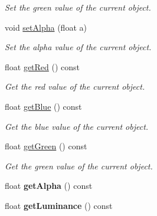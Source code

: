 \begin{DoxyCompactItemize}
\begin{DoxyCompactList}\small\item\em Set the green value of the current object. \end{DoxyCompactList}\item 
\hypertarget{classColorData_a547fb7bd1616e8657a825cb9a34c43c1}{void \hyperlink{classColorData_a547fb7bd1616e8657a825cb9a34c43c1}{set\-Alpha} (float a)}\label{classColorData_a547fb7bd1616e8657a825cb9a34c43c1}

\begin{DoxyCompactList}\small\item\em Set the alpha value of the current object. \end{DoxyCompactList}\item 
\hypertarget{classColorData_ab7066467c08dfad868fc4b1add70c2f2}{float \hyperlink{classColorData_ab7066467c08dfad868fc4b1add70c2f2}{get\-Red} () const }\label{classColorData_ab7066467c08dfad868fc4b1add70c2f2}

\begin{DoxyCompactList}\small\item\em Get the red value of the current object. \end{DoxyCompactList}\item 
\hypertarget{classColorData_ad9c600256c8abefdd76209fc1f68fcb5}{float \hyperlink{classColorData_ad9c600256c8abefdd76209fc1f68fcb5}{get\-Blue} () const }\label{classColorData_ad9c600256c8abefdd76209fc1f68fcb5}

\begin{DoxyCompactList}\small\item\em Get the blue value of the current object. \end{DoxyCompactList}\item 
\hypertarget{classColorData_a7e2e03b8e1e3270f33c4e4a69c00dbd6}{float \hyperlink{classColorData_a7e2e03b8e1e3270f33c4e4a69c00dbd6}{get\-Green} () const }\label{classColorData_a7e2e03b8e1e3270f33c4e4a69c00dbd6}

\begin{DoxyCompactList}\small\item\em Get the green value of the current object. \end{DoxyCompactList}\item 
\hypertarget{classColorData_a198c4490b4f1c512d2bc174418dc892a}{float {\bfseries get\-Alpha} () const }\label{classColorData_a198c4490b4f1c512d2bc174418dc892a}

\item 
\hypertarget{classColorData_ae6a0100e4e5fe7bbd00fb4defd6e4a43}{float {\bfseries get\-Luminance} () const }\label{classColorData_ae6a0100e4e5fe7bbd00fb4defd6e4a43}


\end{DoxyCompactItemize}
